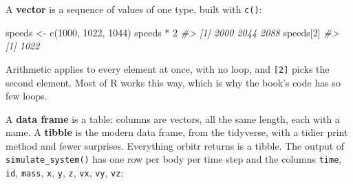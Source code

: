 \documentclass[
  10.5pt,
  letterpaper,
]{scrbook}
\newenvironment{Shaded}{\begin{snugshade}}{\end{snugshade}}
\newcommand{\CommentTok}[1]{\textcolor[rgb]{0.00,0.00,0.00}{\textit{#1}}}
\newcommand{\DecValTok}[1]{\textcolor[rgb]{0.00,0.00,0.00}{#1}}
\newcommand{\FunctionTok}[1]{\textcolor[rgb]{0.00,0.00,0.00}{#1}}
\newcommand{\NormalTok}[1]{\textcolor[rgb]{0.00,0.00,0.00}{#1}}
\newcommand{\OtherTok}[1]{\textcolor[rgb]{0.00,0.00,0.00}{#1}}
\newcommand{\SpecialCharTok}[1]{\textcolor[rgb]{0.00,0.00,0.00}{#1}}
\theoremstyle{definition}
\theoremstyle{plain}
\theoremstyle{remark}
\begin{document}
A \textbf{vector} is a sequence of values of one type, built with
\texttt{c()}:

\begin{Shaded}
\begin{Highlighting}[]
\NormalTok{speeds }\OtherTok{\textless{}{-}} \FunctionTok{c}\NormalTok{(}\DecValTok{1000}\NormalTok{, }\DecValTok{1022}\NormalTok{, }\DecValTok{1044}\NormalTok{)}
\NormalTok{speeds }\SpecialCharTok{*} \DecValTok{2}
\CommentTok{\#\textgreater{} [1] 2000 2044 2088}
\NormalTok{speeds[}\DecValTok{2}\NormalTok{]}
\CommentTok{\#\textgreater{} [1] 1022}
\end{Highlighting}
\end{Shaded}

Arithmetic applies to every element at once, with no loop, and
\texttt{{[}2{]}} picks the second element. Most of R works this way,
which is why the book's code has so few loops.

A \textbf{data frame} is a table: columns are vectors, all the same
length, each with a name. A \textbf{tibble} is the modern data frame,
from the tidyverse, with a tidier print method and fewer surprises.
Everything orbitr returns is a tibble. The output of
\texttt{simulate\_system()} has one row per body per time step and the
columns \texttt{time}, \texttt{id}, \texttt{mass}, \texttt{x},
\texttt{y}, \texttt{z}, \texttt{vx}, \texttt{vy}, \texttt{vz}:
\end{document}

